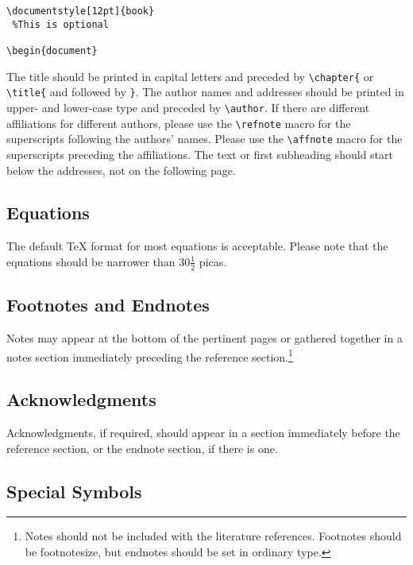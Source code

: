 \documentclass[12pt]{book}
\begin{document}
\begin{verbatim}
\documentstyle[12pt]{book}
 %This is optional

\begin{document}
\end{verbatim}

\smallskip

The title should be printed in capital letters and preceded by
\verb$\chapter{$ or \verb$\title{$ and followed by \verb$}$. The
author names and addresses should be printed in upper- and
lower-case type and preceded by \verb$\author$. If there are
different affiliations for different authors, please use the
\verb+\refnote+ macro for the superscripts following the authors'
names. Please use the \verb+\affnote+ macro for the superscripts
preceding the affiliations. The text or first subheading should
start below the addresses, not on the following page.

\subsection{Equations}

The default {\TeX} format for most equations is acceptable. Please
note that the equations should be narrower than $30 \frac12$ picas.

\subsection{Footnotes and Endnotes}

Notes may appear at the bottom of the pertinent pages or gathered
together in a notes section immediately preceding the reference
section.\footnote{Notes should not be included with the literature
references. Footnotes should be footnotesize, but endnotes should
be set in ordinary type.}

\subsection{Acknowledgments}

Acknowledgments, if required, should appear in a section
immediately before the reference section, or the endnote section,
if there is one.

\subsection{Special Symbols}
\end{document}
